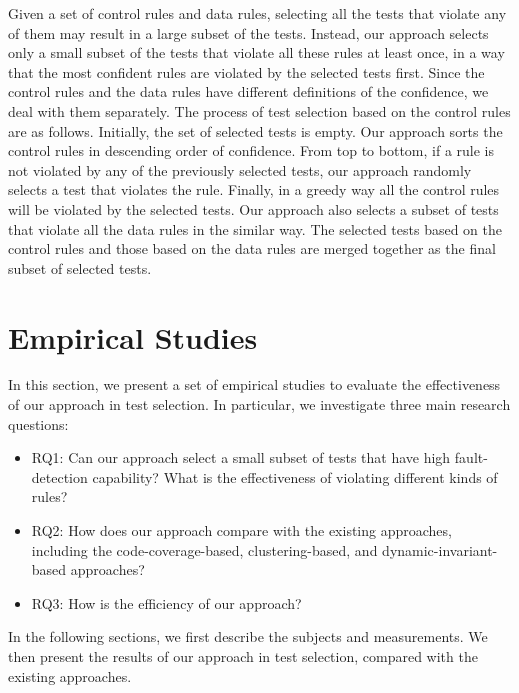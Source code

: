 \documentclass{sig-alternate}
\begin{document}
Given a set of control rules and data rules, selecting all the tests
that violate any of them may result in a large subset of the tests.
Instead, our approach selects only a small subset of the tests that
violate all these rules at least once, in a way that the most
confident rules are violated by the selected tests first. Since the
control rules and the data rules have different definitions of the
confidence, we deal with them separately. The process of test
selection based on the control rules are as follows. Initially, the
set of selected tests is empty. Our approach sorts the control rules
in descending order of confidence. From top to bottom, if a rule is
not violated by any of the previously selected tests, our approach
randomly selects a test that violates the rule. Finally, in a greedy
way all the control rules will be violated by the selected tests.
Our approach also selects a subset of tests that violate all the
data rules in the similar way. The selected tests based on the
control rules and those based on the data rules are merged together
as the final subset of selected tests.







\section{Empirical Studies} \label{sec:studies}

In this section, we present a set of empirical studies to evaluate
the effectiveness of our approach in test selection. In particular,
we investigate three main research questions: %
\begin{itemize}
\item
RQ1: Can our approach select a small subset of tests that have high
fault-detection capability? What is the effectiveness of violating
different kinds of rules?
\item
RQ2: How does our approach compare with the existing approaches,
including the code-coverage-based, clustering-based, and
dynamic-invariant-based approaches?


\item
RQ3: How is the efficiency of our approach?


\end{itemize}


In the following sections, we first describe the subjects and
measurements. We then present the results of our approach in test
selection, compared with the existing approaches.
\end{document}
